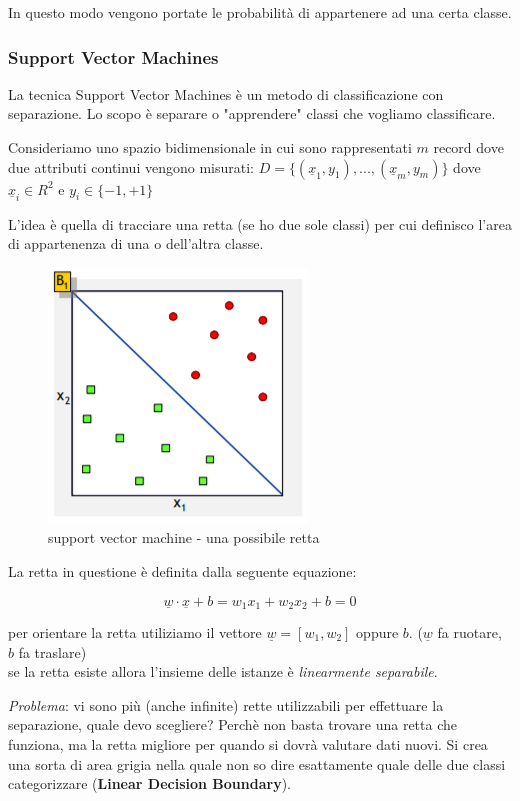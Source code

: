 In questo modo vengono portate le probabilità di appartenere ad una certa classe.	 

\subsubsection{Support Vector Machines}
La tecnica Support Vector Machines è un metodo di classificazione con separazione. Lo scopo \`e separare o "apprendere" classi che vogliamo classificare. 

Consideriamo uno spazio bidimensionale in cui sono rappresentati $m$ record dove due attributi continui vengono misurati: $D = \{(\underline{x}_1, y_1),...,(\underline{x}_m, y_m)\}$ dove $\underline{x}_i \in R^2$ e $y_i \in \{-1, +1\}$

L'idea è quella di tracciare una retta (se ho due sole classi) per cui definisco l'area di appartenenza di una o dell'altra classe. 

\begin{figure}[H]
	\centering
	\includegraphics[height=0.4 \linewidth]{classification/pict/svm.png}
	\caption{support vector machine - una possibile retta}
\end{figure}

La retta in questione è definita dalla seguente equazione:

\[\underline{w} \cdot \underline{x} + b = w_1 x_1 + w_2 x_2 + b = 0\]

per orientare la retta utiliziamo il vettore $\underline{w} = [w_1,w_2]$ oppure $b$. ($\underline{w}$ fa ruotare, $b$ fa traslare)\\
se la retta esiste allora l'insieme delle istanze è \textit{linearmente separabile}.

\textit{Problema}: vi sono pi\`u (anche infinite) rette utilizzabili per effettuare la separazione, quale devo scegliere? Perch\`e non basta trovare una retta che funziona, ma la retta migliore per quando si dovr\`a valutare dati nuovi. Si crea una sorta di area grigia nella quale non so dire esattamente quale delle due classi categorizzare (\textbf{Linear Decision Boundary}).

